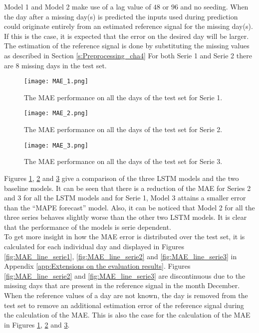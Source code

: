 Model 1 and Model 2 make use of a lag value of $ 48 $ or $ 96 $ and no seeding. When the day after a missing day(s) is predicted the inputs used during prediction could originate entirely from an estimated reference signal for the missing day(s). If this is the case, it is expected that the error on the desired day will be larger. The estimation of the reference signal is done by substituting the missing values as described in Section \ref{s:Preprocessing_cha4} For both Serie 1 and Serie 2 there are $ 8 $ missing days in the test set.

\begin{figure}[h]
	\centering
	\texttt{[image: MAE\_1.png]}
	\caption{The MAE performance on all the days of the test set for Serie 1.}
	\label{fig:MAE_serie1}
\end{figure}

\begin{figure}[h]
	\centering
	\texttt{[image: MAE\_2.png]}
	\caption{The MAE performance on all the days of the test set for Serie 2.}
	\label{fig:MAE_serie2}
\end{figure}	

\begin{figure}[h]
	\centering
	\texttt{[image: MAE\_3.png]}
	\caption{The MAE performance on all the days of the test set for Serie 3.}
	\label{fig:MAE_serie3}
\end{figure}	

Figures \ref{fig:MAE_serie1}, \ref{fig:MAE_serie2} and \ref{fig:MAE_serie3} give a comparison of the three LSTM models and the two baseline models. It can be seen that there is a reduction of the MAE for Series 2 and 3 for all the LSTM models and for Serie 1, Model 3 attains a smaller error than the ``MAPE forecast'' model. Also, it can be noticed that Model 2 for all the three series behaves slightly worse than the other two LSTM models. It is clear that the performance of the models is serie dependent.\\

To get more insight in how the MAE error is distributed over the test set, it is calculated for each individual day and displayed in Figures \ref{fig:MAE_line_serie1}, \ref{fig:MAE_line_serie2} and \ref{fig:MAE_line_serie3} in Appendix \ref{app:Extensions on the evaluation results}. Figures \ref{fig:MAE_line_serie2} and \ref{fig:MAE_line_serie3} are discontinuous due to the missing days that are present in the reference signal in the month December. When the reference values of a day are not known, the day is removed from the test set to remove an additional estimation error of the reference signal during the calculation of the MAE. This is also the case for the calculation of the MAE in Figures \ref{fig:MAE_serie1}, \ref{fig:MAE_serie2} and \ref{fig:MAE_serie3}. \\

